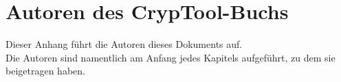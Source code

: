 
\hypertarget{appendix-authors}{}
\section{Autoren des CrypTool-Buchs}
\label{s:appendix-authors}

Dieser Anhang führt die Autoren dieses Dokuments auf.\\
Die Autoren sind namentlich am Anfang jedes Kapitels aufgeführt,
zu dem sie beigetragen haben.

